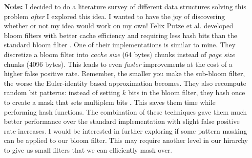 


\color{blue}
\textbf{Note:} I decided to do a literature survey of different data structures solving this problem \textit{after} I explored this idea. 
I wanted to have the joy of discovering whether or not my idea would work on my own!
\color{black}
Felix Putze et al. developed bloom filters with better cache efficiency and requiring less hash bits than the standard bloom filter \cite{Putze}.
One of their implementations is similar to mine. They discretize a bloom filter into \textit{cache size} (64 bytes) chunks instead of \textit{page size} chunks (4096 bytes).
This leads to even \textit{faster} improvements at the cost of a higher false positive rate. Remember, the smaller you make the sub-bloom filter, the worse the Euler-identity based approximation becomes.
They also recompute random bit patterns: instead of setting $k$ bits in the bloom filter, they hash once to create a mask that sets multiplem bits \cite{Putze}. 
This saves them time while performing hash functions. The combination of these techniques gave them much better performance over the standard implementation with slight false positive rate increases.
I would be interested in further exploring if some pattern masking can be applied to our bloom filter. This may require another level in our hirarchy to give us small filters that we can efficiently mask over.

